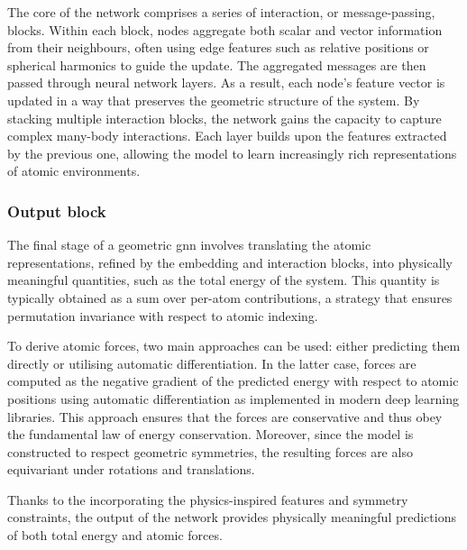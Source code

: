 The core of the network comprises a series of interaction, or message-passing, blocks. Within each block, nodes aggregate both scalar and vector information from their neighbours, often using edge features such as relative positions or spherical harmonics to guide the update. The aggregated messages are then passed through neural network layers. As a result, each node's feature vector is updated in a way that preserves the geometric structure of the system. By stacking multiple interaction blocks, the network gains the capacity to capture complex many-body interactions. Each layer builds upon the features extracted by the previous one, allowing the model to learn increasingly rich representations of atomic environments.

\subsubsection{Output block}
The final stage of a geometric \ac{gnn} involves translating the atomic representations, refined by the embedding and interaction blocks, into physically meaningful quantities, such as the total energy of the system. This quantity is typically obtained as a sum over per-atom contributions, a strategy that ensures permutation invariance with respect to atomic indexing.

To derive atomic forces, two main approaches can be used: either predicting them directly or utilising automatic differentiation. In the latter case, forces are computed as the negative gradient of the predicted energy with respect to atomic positions using automatic differentiation as implemented in modern deep learning libraries. This approach ensures that the forces are conservative and thus obey the fundamental law of energy conservation. Moreover, since the model is constructed to respect geometric symmetries, the resulting forces are also equivariant under rotations and translations.

Thanks to the incorporating the physics-inspired features and symmetry constraints, the output of the network provides physically meaningful predictions of both total energy and atomic forces.